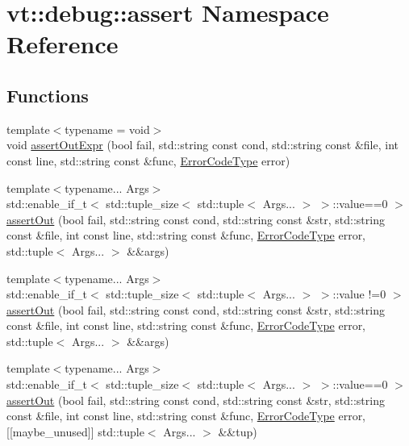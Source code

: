 \hypertarget{namespacevt_1_1debug_1_1assert}{}\section{vt\+:\+:debug\+:\+:assert Namespace Reference}
\label{namespacevt_1_1debug_1_1assert}
\subsection*{Functions}
\begin{DoxyCompactItemize}
\item 
{\footnotesize template$<$typename  = void$>$ }\\void \hyperlink{namespacevt_1_1debug_1_1assert_ad28250da4c859ea57caf834fcb3e125f}{assert\+Out\+Expr} (bool fail, std\+::string const cond, std\+::string const \&file, int const line, std\+::string const \&func, \hyperlink{namespacevt_a793764d753923abc3d32929870beb485}{Error\+Code\+Type} error)
\item 
{\footnotesize template$<$typename... Args$>$ }\\std\+::enable\+\_\+if\+\_\+t$<$ std\+::tuple\+\_\+size$<$ std\+::tuple$<$ Args... $>$ $>$\+::value==0 $>$ \hyperlink{namespacevt_1_1debug_1_1assert_a1cefa1612d9e8d8c59e9908fc4011c5e}{assert\+Out} (bool fail, std\+::string const cond, std\+::string const \&str, std\+::string const \&file, int const line, std\+::string const \&func, \hyperlink{namespacevt_a793764d753923abc3d32929870beb485}{Error\+Code\+Type} error, std\+::tuple$<$ Args... $>$ \&\&args)
\item 
{\footnotesize template$<$typename... Args$>$ }\\std\+::enable\+\_\+if\+\_\+t$<$ std\+::tuple\+\_\+size$<$ std\+::tuple$<$ Args... $>$ $>$\+::value !=0 $>$ \hyperlink{namespacevt_1_1debug_1_1assert_a4bc7c613ca106f6d3d7867389c4380d0}{assert\+Out} (bool fail, std\+::string const cond, std\+::string const \&str, std\+::string const \&file, int const line, std\+::string const \&func, \hyperlink{namespacevt_a793764d753923abc3d32929870beb485}{Error\+Code\+Type} error, std\+::tuple$<$ Args... $>$ \&\&args)
\item 
{\footnotesize template$<$typename... Args$>$ }\\std\+::enable\+\_\+if\+\_\+t$<$ std\+::tuple\+\_\+size$<$ std\+::tuple$<$ Args... $>$ $>$\+::value==0 $>$ \hyperlink{namespacevt_1_1debug_1_1assert_af31fa4a20c73d621b9611a1bae95b5cd}{assert\+Out} (bool fail, std\+::string const cond, std\+::string const \&str, std\+::string const \&file, int const line, std\+::string const \&func, \hyperlink{namespacevt_a793764d753923abc3d32929870beb485}{Error\+Code\+Type} error, \mbox{[}\mbox{[}maybe\+\_\+unused\mbox{]}\mbox{]} std\+::tuple$<$ Args... $>$ \&\&tup)

\end{DoxyCompactItemize}

